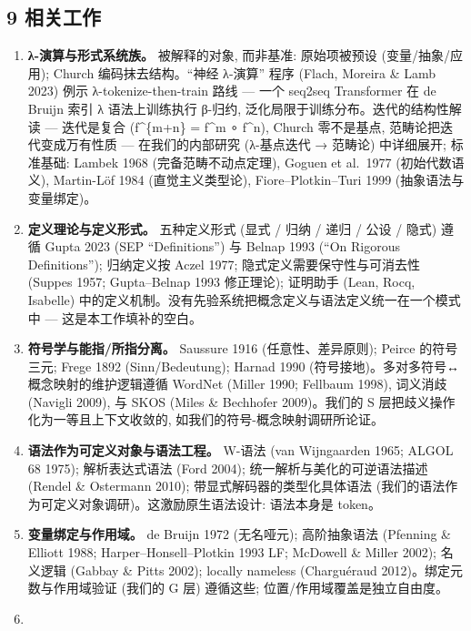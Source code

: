 \documentclass[
]{article}
\providecommand{\tightlist}{%
  \setlength{\itemsep}{0pt}\setlength{\parskip}{0pt}}
\begin{document}
\subsection{9 相关工作}\label{ux76f8ux5173ux5de5ux4f5c}

\begin{enumerate}
\def\labelenumi{\arabic{enumi}.}
\tightlist
\item
  \textbf{λ-演算与形式系统族。} 被解释的对象, 而非基准: 原始项被预设
  (变量/抽象/应用); Church 编码抹去结构。``神经 λ-演算'' 程序 (Flach,
  Moreira \& Lamb 2023) 例示 λ-tokenize-then-train 路线 --- 一个 seq2seq
  Transformer 在 de Bruijn 索引 λ 语法上训练执行 β-归约,
  泛化局限于训练分布。迭代的结构性解读 --- 迭代是复合 (f\^{}\{m+n\} =
  f\^{}m ∘ f\^{}n), Church 零不是基点, 范畴论把迭代变成万有性质 ---
  在我们的内部研究 (λ-基点迭代 → 范畴论) 中详细展开; 标准基础: Lambek
  1968 (完备范畴不动点定理), Goguen et al.~1977 (初始代数语义),
  Martin-Löf 1984 (直觉主义类型论), Fiore--Plotkin--Turi 1999
  (抽象语法与变量绑定)。
\item
  \textbf{定义理论与定义形式。} 五种定义形式 (显式 / 归纳 / 递归 / 公设
  / 隐式) 遵循 Gupta 2023 (SEP ``Definitions'') 与 Belnap 1993 (``On
  Rigorous Definitions''); 归纳定义按 Aczel 1977;
  隐式定义需要保守性与可消去性 (Suppes 1957; Gupta--Belnap 1993
  修正理论); 证明助手 (Lean, Rocq, Isabelle)
  中的定义机制。没有先验系统把概念定义与语法定义统一在一个模式中 ---
  这是本工作填补的空白。
\item
  \textbf{符号学与能指/所指分离。} Saussure 1916 (任意性、差异原则);
  Peirce 的符号三元; Frege 1892 (Sinn/Bedeutung); Harnad 1990
  (符号接地)。多对多符号↔概念映射的维护逻辑遵循 WordNet (Miller 1990;
  Fellbaum 1998), 词义消歧 (Navigli 2009), 与 SKOS (Miles \& Bechhofer
  2009)。我们的 S 层把歧义操作化为一等且上下文收敛的,
  如我们的符号-概念映射调研所论证。
\item
  \textbf{语法作为可定义对象与语法工程。} W-语法 (van Wijngaarden 1965;
  ALGOL 68 1975); 解析表达式语法 (Ford 2004);
  统一解析与美化的可逆语法描述 (Rendel \& Ostermann 2010);
  带显式解码器的类型化具体语法
  (我们的语法作为可定义对象调研)。这激励原生语法设计: 语法本身是 token。
\item
  \textbf{变量绑定与作用域。} de Bruijn 1972 (无名哑元); 高阶抽象语法
  (Pfenning \& Elliott 1988; Harper--Honsell--Plotkin 1993 LF; McDowell
  \& Miller 2002); 名义逻辑 (Gabbay \& Pitts 2002); locally nameless
  (Charguéraud 2012)。绑定元数与作用域验证 (我们的 G 层) 遵循这些;
  位置/作用域覆盖是独立自由度。
\item

\end{enumerate}
\end{document}
